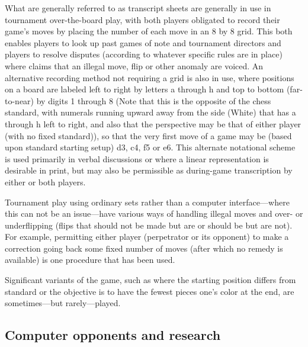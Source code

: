\documentclass[a4paper]{report}
\begin{document}
\par
What are generally referred to as transcript sheets are generally in use in tournament over-the-board play, with both players obligated to record their game's moves by placing the number of each move in an 8 by 8 grid. This both enables players to look up past games of note and tournament directors and players to resolve disputes (according to whatever specific rules are in place) where claims that an illegal move, flip or other anomaly are voiced. An alternative recording method not requiring a grid is also in use, where positions on a board are labeled left to right by letters a through h and top to bottom (far-to-near) by digits 1 through 8 (Note that this is the opposite of the chess standard, with numerals running upward away from the side (White) that has a through h left to right, and also that the perspective may be that of either player (with no fixed standard)), so that the very first move of a game may be (based upon standard starting setup) d3, c4, f5 or e6. This alternate notational scheme is used primarily in verbal discussions or where a linear representation is desirable in print, but may also be permissible as during-game transcription by either or both players. 
\par
Tournament play using ordinary sets rather than a computer interface—where this can not be an issue—have various ways of handling illegal moves and over- or underflipping (flips that should not be made but are or should be but are not). For example, permitting either player (perpetrator or its opponent) to make a correction going back some fixed number of moves (after which no remedy is available) is one procedure that has been used. 
\par
Significant variants of the game, such as where the starting position differs from standard or the objective is to have the fewest pieces one's color at the end, are sometimes—but rarely—played. 
\subsection{Computer opponents and research}
\end{document}
